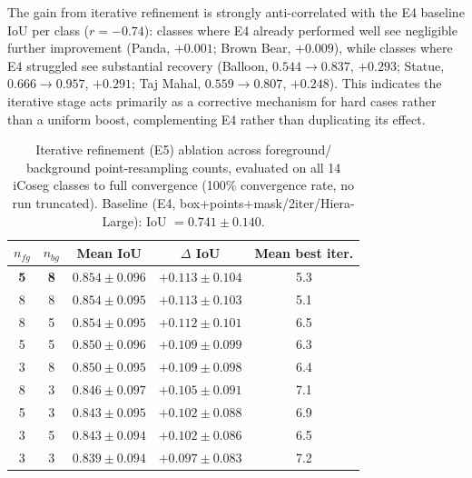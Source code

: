 The gain from iterative refinement is strongly anti-correlated with
the E4 baseline IoU per class ($r=-0.74$): classes where E4 already
performed well see negligible further improvement (Panda,
$+0.001$; Brown Bear, $+0.009$), while classes where E4 struggled
see substantial recovery (Balloon, $0.544\to0.837$, $+0.293$;
Statue, $0.666\to0.957$, $+0.291$; Taj Mahal, $0.559\to0.807$,
$+0.248$). This indicates the iterative stage acts primarily as a
corrective mechanism for hard cases rather than a uniform boost,
complementing E4 rather than duplicating its effect.

\begin{table}[t]
\centering
\caption{Iterative refinement (E5) ablation across foreground/
background point-resampling counts, evaluated on all 14 iCoseg
classes to full convergence (100\% convergence rate, no run
truncated). Baseline (E4, box+points+mask/2iter/Hiera-Large):
IoU $= 0.741 \pm 0.140$.}
\label{tab:ablation-e5}
\begin{tabular}{@{}ccccc@{}}
\toprule
$n_{fg}$ & $n_{bg}$ & Mean IoU & $\Delta$ IoU & Mean best iter. \\
\midrule
\textbf{5} & \textbf{8} & $\mathbf{0.854 \pm 0.096}$ & $\mathbf{+0.113 \pm 0.104}$ & 5.3 \\
8 & 8 & $0.854 \pm 0.095$ & $+0.113 \pm 0.103$ & 5.1 \\
8 & 5 & $0.854 \pm 0.095$ & $+0.112 \pm 0.101$ & 6.5 \\
5 & 5 & $0.850 \pm 0.096$ & $+0.109 \pm 0.099$ & 6.3 \\
3 & 8 & $0.850 \pm 0.095$ & $+0.109 \pm 0.098$ & 6.4 \\
8 & 3 & $0.846 \pm 0.097$ & $+0.105 \pm 0.091$ & 7.1 \\
5 & 3 & $0.843 \pm 0.095$ & $+0.102 \pm 0.088$ & 6.9 \\
3 & 5 & $0.843 \pm 0.094$ & $+0.102 \pm 0.086$ & 6.5 \\
3 & 3 & $0.839 \pm 0.094$ & $+0.097 \pm 0.083$ & 7.2 \\
\bottomrule
\end{tabular}
\end{table}


